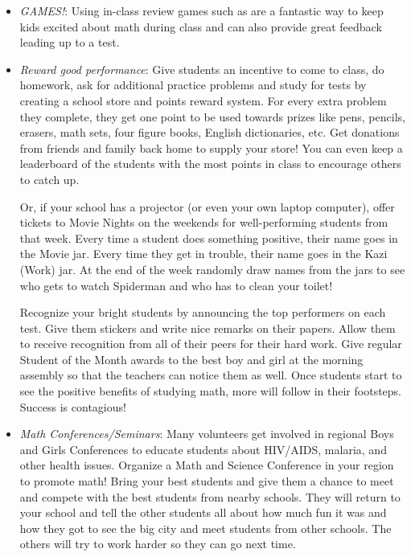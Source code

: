 \begin{itemize}
\item\emph{GAMES!}: Using in-class review games such as  are a fantastic way to keep kids excited about math during class and can also provide great feedback leading up to a test.

\item\emph{Reward good performance}: Give students an incentive to come to class, do homework, ask for additional practice problems and study for tests by creating a school store and points reward system. For every extra problem they complete, they get one point to be used towards prizes like pens, pencils, erasers, math sets, four figure books, English dictionaries, etc. Get donations from friends and family back home to supply your store! You can even keep a leaderboard of the students with the most points in class to encourage others to catch up.

Or, if your school has a projector (or even your own laptop computer), offer tickets to Movie Nights on the weekends for well-performing students from that week. Every time a student does something positive, their name goes in the Movie jar. Every time they get in trouble, their name goes in the Kazi (Work) jar. At the end of the week randomly draw names from the jars to see who gets to watch Spiderman and who has to clean your toilet!

Recognize your bright students by announcing the top performers on each test. Give them stickers and write nice remarks on their papers. Allow them to receive recognition from all of their peers for their hard work. Give regular Student of the Month awards to the best boy and girl at the morning assembly so that the teachers can notice them as well. Once students start to see the positive benefits of studying math, more will follow in their footsteps. Success is contagious!

\item\emph{Math Conferences\slash Seminars}: Many volunteers get involved in regional Boys and Girls Conferences to educate students about HIV\slash AIDS, malaria, and other health issues. Organize a Math and Science Conference in your region to promote math! Bring your best students and give them a chance to meet and compete with the best students from nearby schools. They will return to your school and tell the other students all about how much fun it was and how they got to see the big city and meet students from other schools. The others will try to work harder so they can go next time.


\end{itemize}
